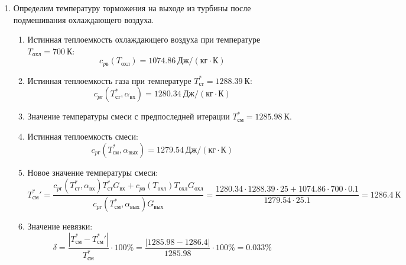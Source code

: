\documentclass[a4paper,10pt]{article}
\begin{document}
\begin{enumerate}
        \item Определим температуру торможения на выходе из турбины после подмешивания охлаждающего воздуха.
        \begin{enumerate}

            \item Истинная теплоемкость охлаждающего воздуха при температуре $T_{охл} = 700\ К $:
            \[
                c_{pв} (T_{охл}) = 1074.86\ Дж/ (кг \cdot К)
            \]

            \item Истинная теплоемкость газа при температуре $T_{ст}^* = 1288.39 \ К $:
            \[
                c_{pг} (T_{ст}^*, \alpha_{вх}) =
                1280.34\ Дж/ (кг \cdot К)
            \]

            \item Значение температуры смеси с предпоследней итерации $T_{см}^{*} = 1285.98\ К$.

            \item Истинная теплоемкость смеси:
            \[
                c_{pг} (T_{см}^{*}, \alpha_{вых}) =
                1279.54\ Дж/ (кг \cdot К)
            \]

            \item Новое значение температуры смеси:
            \[
                T_{см}^*\prime = \frac{
                        c_{pг} (T_{ст}^*, \alpha_{вх}) T_{ст}^* G_{вх} + c_{pв} (T_{охл}) T_{охл} G_{охл}
                    }{
                        c_{pг} (T_{см}^{*}, \alpha_{вых}) G_{вых}
                    } =
                \frac{
                    1280.34
                    \cdot 1288.39 \cdot 25 +
                    1074.86
                    \cdot 700 \cdot 0.1
                }{
                    1279.54
                    \cdot  25.1
                } =
                1286.4\ К
            \]

            \item Значение невязки:
            \[
                \delta = \frac{ \left| T_{см}^{*} - T_{см}^*\prime \right| }{T_{см}^{*}} \cdot 100 \% =
                    \frac{
                        \left| 1285.98 - 1286.4 \right|
                    }{
                        1285.98
                    } \cdot 100 \% =
                0.033 \%
            \]

        \end{enumerate}

        

    \end{enumerate}
    
\end{document}

